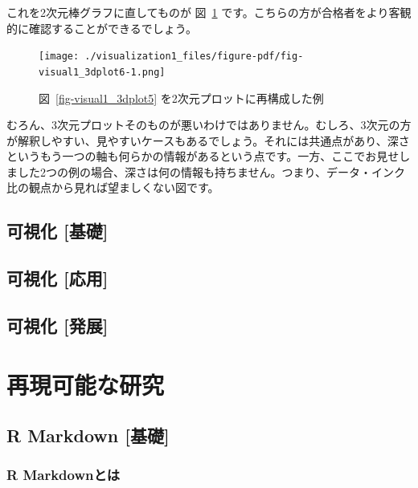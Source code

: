 \documentclass[
  a4paper,
  pandoc,
  ja=standard,
  jafont=haranoaji]{bxjsbook}
\begin{document}
これを2次元棒グラフに直してものが 図~\ref{fig-visual1_3dplot6}
です。こちらの方が合格者をより客観的に確認することができるでしょう。

\begin{figure}

{\centering \texttt{[image: ./visualization1\_files/figure-pdf/fig-visual1\_3dplot6-1.png]}

}

\caption{\label{fig-visual1_3dplot6}図~\ref{fig-visual1_3dplot5}
を2次元プロットに再構成した例}

\end{figure}

むろん、3次元プロットそのものが悪いわけではありません。むしろ、3次元の方が解釈しやすい、見やすいケースもあるでしょう。それには共通点があり、深さというもう一つの軸も何らかの情報があるという点です。一方、ここでお見せしました2つの例の場合、深さは何の情報も持ちません。つまり、データ・インク比の観点から見れば望ましくない図です。

\hypertarget{sec-visualization2}{%
\chapter{可視化 {[}基礎{]}}\label{sec-visualization2}}

\hypertarget{sec-visualization3}{%
\chapter{可視化 {[}応用{]}}\label{sec-visualization3}}

\hypertarget{sec-visualization4}{%
\chapter{可視化 {[}発展{]}}\label{sec-visualization4}}

\part{再現可能な研究}

\hypertarget{sec-rmarkdown}{%
\chapter{R Markdown {[}基礎{]}}\label{sec-rmarkdown}}

\hypertarget{rmarkdown-intro}{%
\section{R Markdownとは}\label{rmarkdown-intro}}
\end{document}
